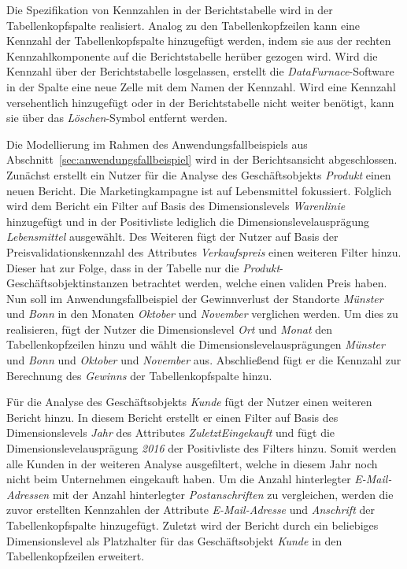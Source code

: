 \documentclass[
  language=german, %
  type=bachelor,%
  ngerman
]{isthesis}
\begin{document}
\begin{content}
  Die Spezifikation von Kennzahlen in der Berichtstabelle wird in der
  Tabellenkopfspalte realisiert. Analog zu den Tabellenkopfzeilen kann eine
  Kennzahl der Tabellenkopfspalte hinzugefügt werden, indem sie aus der rechten
  Kennzahlkomponente auf die Berichtstabelle herüber gezogen wird. Wird die
  Kennzahl über der Berichtstabelle losgelassen, erstellt die
  \textit{DataFurnace}-Software in der Spalte eine neue Zelle mit dem Namen der
  Kennzahl. Wird eine Kennzahl versehentlich hinzugefügt oder in der
  Berichtstabelle nicht weiter benötigt, kann sie über das
  \textit{Löschen}-Symbol entfernt werden.

  Die Modellierung im Rahmen des Anwendungsfallbeispiels aus
  Abschnitt~\ref{sec:anwendungsfallbeispiel} wird in der Berichts\-ansicht
  abgeschlossen. Zunächst erstellt ein Nutzer für die Analyse des
  Geschäftsobjekts \textit{Produkt} einen neuen Bericht. Die Marketingkampagne
  ist auf Lebensmittel fokussiert. Folglich wird dem Bericht ein Filter auf
  Basis des Dimensionslevels \textit{Warenlinie} hinzugefügt und in der
  Positivliste lediglich die Dimensionslevelausprägung \textit{Lebensmittel}
  ausgewählt. Des Weiteren fügt der Nutzer auf Basis der
  Preisvalidationskennzahl des Attributes \textit{Verkaufspreis} einen weiteren
  Filter hinzu. Dieser hat zur Folge, dass in der Tabelle nur die
  \textit{Produkt}-Geschäftsobjektinstanzen betrachtet werden, welche einen
  validen Preis haben. Nun soll im Anwendungsfallbeispiel der Gewinnverlust der
  Standorte \textit{Münster} und \textit{Bonn} in den Monaten \textit{Oktober}
  und \textit{November} verglichen werden. Um dies zu realisieren, fügt der
  Nutzer die Dimensionslevel \textit{Ort} und \textit{Monat} den
  Tabellenkopfzeilen hinzu und wählt die Dimensionslevelausprägungen
  \textit{Münster} und \textit{Bonn} und \textit{Oktober} und \textit{November}
  aus. Abschließend fügt er die Kennzahl zur Berechnung des \textit{Gewinns}
  der Tabellenkopfspalte hinzu.

  Für die Analyse des Geschäftsobjekts \textit{Kunde} fügt der Nutzer einen
  weiteren Bericht hinzu. In diesem Bericht erstellt er einen Filter auf Basis
  des Dimensionslevels \textit{Jahr} des Attributes \textit{Zuletzt\-Eingekauft} und fügt
  die Dimensionslevelausprägung \textit{2016} der Positivliste des Filters
  hinzu. Somit werden alle Kunden in der weiteren Analyse ausgefiltert, welche
  in diesem Jahr noch nicht beim Unternehmen eingekauft haben. Um die Anzahl
  hinterlegter \textit{E-Mail-Adressen} mit der Anzahl hinterlegter
  \textit{Postanschriften} zu vergleichen, werden die zuvor erstellten
  Kennzahlen der Attribute \textit{E-Mail-Adresse} und \textit{Anschrift} der
  Tabellenkopfspalte hinzugefügt. Zuletzt wird der Bericht durch ein beliebiges
  Dimensionslevel als Platzhalter für das Geschäftsobjekt \textit{Kunde} in den
  Tabellenkopfzeilen erweitert.



\end{content}
\end{document}
